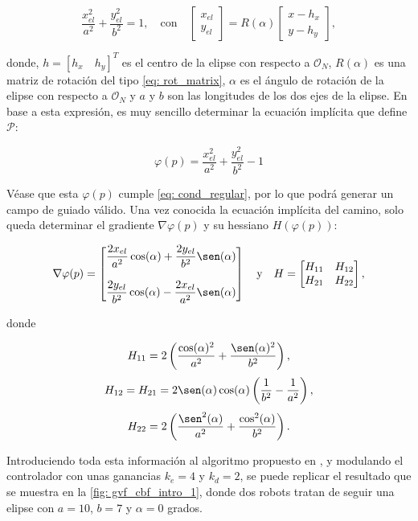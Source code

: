 $$
    \frac{x_{el}^2}{a^2} + \frac{y_{el}^2}{b^2} = 1, \quad \text{con} \quad 
    \left [
    \begin{array}{c}
         x_{el}\\
         y_{el} 
    \end{array}
    \right ] 
    = R(\alpha)
    \left [
    \begin{array}{c}
         x - h_x\\
         y - h_y 
    \end{array}
    \right ],
$$

donde, $h = [h_x \quad h_y]^T$ es el centro de la elipse con respecto a $\mathcal{O}_N$, $R(\alpha)$ es una matriz de rotación del tipo \eqref{eq: rot_matrix}, $\alpha$ es el ángulo de rotación de la elipse con respecto a $\mathcal{O}_N$ y $a$ y $b$ son las longitudes de los dos ejes de la elipse. En base a esta expresión, es muy sencillo determinar la ecuación implícita que define $\mathcal{P}$:

$$
    \varphi(p) = \frac{x_{el}^2}{a^2} + \frac{y_{el}^2}{b^2} - 1
$$

Véase que esta $\varphi(p)$ cumple \eqref{eq: cond_regular}, por lo que podrá generar un campo de guiado válido. Una vez conocida la ecuación implícita del camino, solo queda determinar el gradiente $\nabla \varphi(p)$ y su hessiano $H(\varphi(p))$:

$$
    \nabla \varphi(p) =
    \left [
    \begin{matrix}
         \dfrac{2 x_{el}}{a^2} \cos(\alpha) + \dfrac{2 y_{el}}{b^2} \sen(\alpha)\\
         \\
         \dfrac{2 y_{el}}{b^2} \cos(\alpha) - \dfrac{2 x_{el}}{a^2} \sen(\alpha)
    \end{matrix}
    \right ] \quad
    \text{y} \quad
    H = \left [
    \begin{matrix}
         H_{11} & H_{12}\\
         H_{21} & H_{22}
    \end{matrix}
    \right ], 
$$

\newpage

donde 

$$
    H_{11} = 2 \left( \frac{\cos(\alpha)^2}{a^2} + \frac{\sen(\alpha)^2}{b^2} \right),
$$
$$
    H_{12} = H_{21} = 2 \sen(\alpha) \cos(\alpha) \left( \frac{1}{b^2} - \frac{1}{a^2} \right),
$$
$$  
    H_{22} = 2 \left( \frac{\sen^2(\alpha)}{a^2} + \frac{\cos^2(\alpha)}{b^2} \right).
$$


Introduciendo toda esta información al algoritmo propuesto en \cite{gvf_classic}, y modulando el controlador con unas ganancias $k_e = 4$ y $k_d = 2$, se puede replicar el resultado que se muestra en la \autoref{fig: gvf_cbf_intro_1}, donde dos robots tratan de seguir una elipse con $a = 10$, $b = 7$ y $\alpha = 0$ grados.


